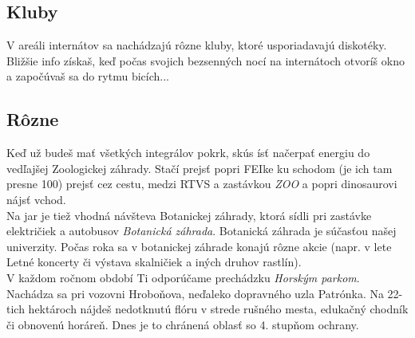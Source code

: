 \subsection*{Kluby}
V areáli internátov sa nachádzajú rôzne kluby, ktoré usporiadavajú diskotéky. Bližšie info získaš, keď počas svojich bezsenných nocí na internátoch otvoríš okno a započúvaš sa do rytmu bicích... %
 
\subsection*{Rôzne}
Keď už budeš mať všetkých integrálov pokrk, skús ísť načerpať energiu do vedľajšej Zoologickej záhrady. Stačí prejsť popri FEIke ku schodom (je ich tam presne 100) prejsť cez cestu, medzi RTVS a zastávkou \emph{ZOO} a popri dinosaurovi nájsť vchod. \\
Na jar je tiež vhodná návšteva Botanickej záhrady, ktorá sídli pri zastávke električiek a autobusov \emph{Botanická záhrada}. Botanická záhrada je súčasťou našej univerzity. Počas roka sa v botanickej záhrade konajú rôzne akcie (napr. v lete Letné koncerty či výstava skalničiek a iných druhov rastlín).\\

V každom ročnom období Ti odporúčame prechádzku \emph{Horským parkom}. Nachádza sa pri vozovni Hroboňova, neďaleko dopravného uzla Patrónka. Na 22-tich hektároch nájdeš nedotknutú flóru v strede rušného mesta, edukačný chodník či obnovenú horáreň. Dnes je to chránená oblasť so 4. stupňom ochrany.
